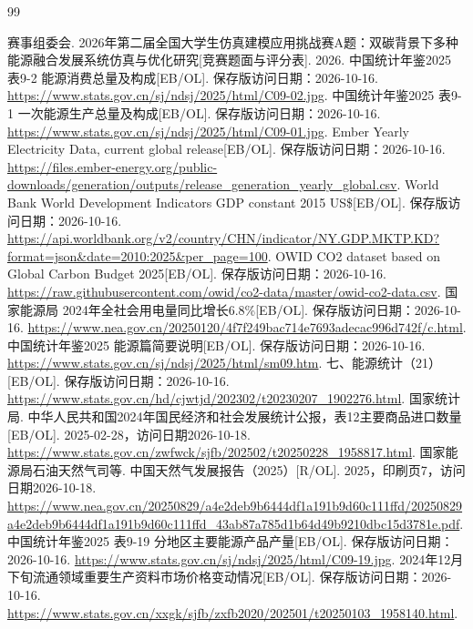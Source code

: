 \begingroup\small
\begin{thebibliography}{99}\setlength{\itemsep}{2pt}
 赛事组委会. 2026年第二届全国大学生仿真建模应用挑战赛A题：双碳背景下多种能源融合发展系统仿真与优化研究[竞赛题面与评分表]. 2026.
 中国统计年鉴2025 表9-2 能源消费总量及构成[EB/OL]. 保存版访问日期：2026-10-16. \url{https://www.stats.gov.cn/sj/ndsj/2025/html/C09-02.jpg}.
 中国统计年鉴2025 表9-1 一次能源生产总量及构成[EB/OL]. 保存版访问日期：2026-10-16. \url{https://www.stats.gov.cn/sj/ndsj/2025/html/C09-01.jpg}.
 Ember Yearly Electricity Data, current global release[EB/OL]. 保存版访问日期：2026-10-16. \url{https://files.ember-energy.org/public-downloads/generation/outputs/release_generation_yearly_global.csv}.
 World Bank World Development Indicators GDP constant 2015 US\$[EB/OL]. 保存版访问日期：2026-10-16. \url{https://api.worldbank.org/v2/country/CHN/indicator/NY.GDP.MKTP.KD?format=json&date=2010:2025&per_page=100}.
 OWID CO2 dataset based on Global Carbon Budget 2025[EB/OL]. 保存版访问日期：2026-10-16. \url{https://raw.githubusercontent.com/owid/co2-data/master/owid-co2-data.csv}.
 国家能源局 2024年全社会用电量同比增长6.8\%[EB/OL]. 保存版访问日期：2026-10-16. \url{https://www.nea.gov.cn/20250120/4f7f249bac714e7693adecac996d742f/c.html}.
 中国统计年鉴2025 能源篇简要说明[EB/OL]. 保存版访问日期：2026-10-16. \url{https://www.stats.gov.cn/sj/ndsj/2025/html/sm09.htm}.
 七、能源统计（21）[EB/OL]. 保存版访问日期：2026-10-16. \url{https://www.stats.gov.cn/hd/cjwtjd/202302/t20230207_1902276.html}.
 国家统计局. 中华人民共和国2024年国民经济和社会发展统计公报，表12主要商品进口数量[EB/OL]. 2025-02-28，访问日期2026-10-18. \url{https://www.stats.gov.cn/zwfwck/sjfb/202502/t20250228_1958817.html}.
 国家能源局石油天然气司等. 中国天然气发展报告（2025）[R/OL]. 2025，印刷页7，访问日期2026-10-18. \url{https://www.nea.gov.cn/20250829/a4e2deb9b6444df1a191b9d60c111ffd/20250829a4e2deb9b6444df1a191b9d60c111ffd_43ab87a785d1b64d49b9210dbc15d3781e.pdf}.
 中国统计年鉴2025 表9-19 分地区主要能源产品产量[EB/OL]. 保存版访问日期：2026-10-16. \url{https://www.stats.gov.cn/sj/ndsj/2025/html/C09-19.jpg}.
 2024年12月下旬流通领域重要生产资料市场价格变动情况[EB/OL]. 保存版访问日期：2026-10-16. \url{https://www.stats.gov.cn/xxgk/sjfb/zxfb2020/202501/t20250103_1958140.html}.

\end{thebibliography}

